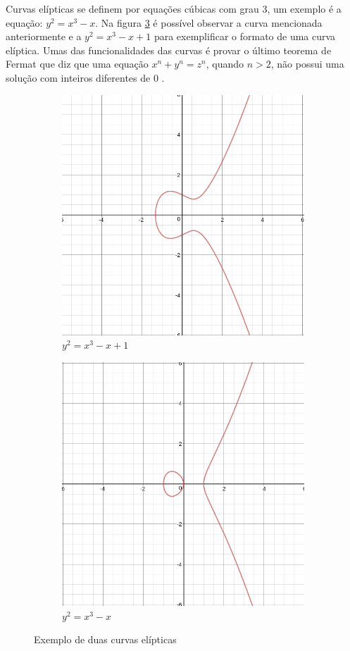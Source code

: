 Curvas elípticas se definem por equações cúbicas com grau 3, um exemplo é a equação: $y^2 = x^3 - x$. Na figura \ref{fig:curvas} é possível observar a curva mencionada anteriormente e a $y^2 = x^3 -x + 1$ para exemplificar o formato de uma curva elíptica. Umas das funcionalidades das curvas é provar o último teorema de Fermat que diz que uma equação $x^n + y^n = z^n$, quando $n > 2$, não possui uma solução com inteiros diferentes de $0$ \cite{Hankerson:2003:GEC:940321}.

\begin{figure}[h!]
\centering
\begin{subfigure}{.5\textwidth}
  \centering
  \includegraphics[width=.6\linewidth]{figures/curve1.png}
  \caption{$y^2 = x^3 -x + 1$}
  \label{fig:sub1}
\end{subfigure}%
\begin{subfigure}{.5\textwidth}
  \centering
  \includegraphics[width=.6\linewidth]{figures/curve2.png}
  \caption{$y^2 = x^3 - x$}
  \label{fig:sub2}
\end{subfigure}
\caption{Exemplo de duas curvas elípticas}
\label{fig:curvas}
\end{figure}


